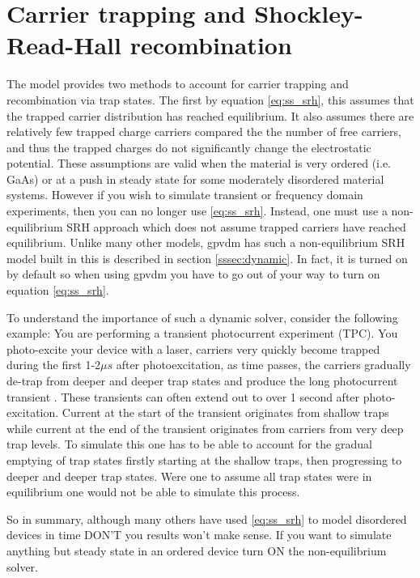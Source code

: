 \section{Carrier trapping and Shockley-Read-Hall recombination}
\label{sec:SRHintro}
The model provides two methods to account for carrier trapping and recombination via trap states.  The first by equation \ref{eq:ss_srh}, this assumes that the trapped carrier distribution has reached equilibrium.  It also assumes there are relatively few trapped charge carriers compared the the number of free carriers, and thus the trapped charges do not significantly change the electrostatic potential.  These assumptions are valid when the material is very ordered (i.e. GaAs) or at a push in steady state for some moderately disordered material systems. However if you wish to simulate transient or frequency domain experiments, then you can no longer use \ref{eq:ss_srh}.  Instead, one must use a non-equilibrium SRH approach which does not assume trapped carriers have reached equilibrium.  Unlike many other models, gpvdm has such a non-equilibrium SRH model built in this is described in section \ref{sssec:dynamic}. In fact, it is turned on by default so when using gpvdm you have to go out of your way to turn on equation \ref{eq:ss_srh}.

To understand the importance of such a dynamic solver, consider the following example: You are performing a transient photocurrent experiment (TPC). You photo-excite your device with a laser, carriers very quickly become trapped during the first 1-2$\mu s$ after photoexcitation, as time passes, the carriers gradually de-trap from deeper and deeper trap states and produce the long photocurrent transient \cite{mackenzie2013interpreting}. These transients can often extend out to over 1 second after photo-excitation.  Current at the start of the transient originates from shallow traps while current at the end of the transient originates from carriers from very deep trap levels. To simulate this one has to be able to account for the gradual emptying of trap states firstly starting at the shallow traps, then progressing to deeper and deeper trap states. Were one to assume all trap states were in equilibrium one would not be able to simulate this process.

So in summary, although many others have used \ref{eq:ss_srh} to model disordered devices in time DON'T you results won't make sense. If you want to simulate anything but steady state in an ordered device turn ON the non-equilibrium solver.
